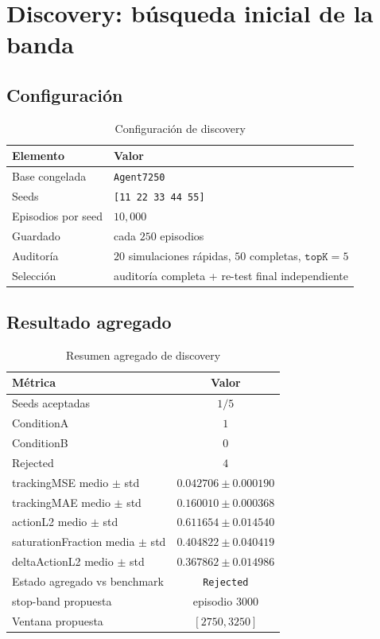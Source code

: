 \documentclass[11pt,a4paper]{article}
\begin{document}
\section*{Discovery: b\'usqueda inicial de la banda}
\subsection*{Configuraci\'on}
\begin{table}[H]
\centering
\caption{Configuraci\'on de discovery}
\begin{tabularx}{\linewidth}{lY}
\toprule
Elemento & Valor \\
\midrule
Base congelada & \texttt{Agent7250} \\
Seeds & \texttt{[11 22 33 44 55]} \\
Episodios por seed & \(10{,}000\) \\
Guardado & cada \(250\) episodios \\
Auditor\'ia & \(20\) simulaciones r\'apidas, \(50\) completas, \(\texttt{topK}=5\) \\
Selecci\'on & auditor\'ia completa + re-test final independiente \\
\bottomrule
\end{tabularx}
\end{table}

\subsection*{Resultado agregado}
\begin{table}[H]
\centering
\caption{Resumen agregado de discovery}
\begin{tabularx}{\linewidth}{l c}
\toprule
M\'etrica & Valor \\
\midrule
Seeds aceptadas & \(1/5\) \\
ConditionA & \(1\) \\
ConditionB & \(0\) \\
Rejected & \(4\) \\
trackingMSE medio \(\pm\) std & \(0.042706 \pm 0.000190\) \\
trackingMAE medio \(\pm\) std & \(0.160010 \pm 0.000368\) \\
actionL2 medio \(\pm\) std & \(0.611654 \pm 0.014540\) \\
saturationFraction media \(\pm\) std & \(0.404822 \pm 0.040419\) \\
deltaActionL2 medio \(\pm\) std & \(0.367862 \pm 0.014986\) \\
Estado agregado vs benchmark & \texttt{Rejected} \\
stop-band propuesta & episodio \(3000\) \\
Ventana propuesta & \([2750, 3250]\) \\
\bottomrule
\end{tabularx}
\end{table}
\end{document}
